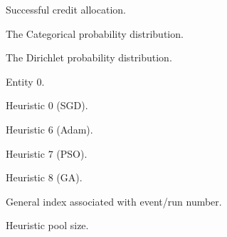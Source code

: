 \begin{description}
	\item [\parbox{2cm}{$c_{1}$}] Successful credit allocation.
	\item [\parbox{2cm}{$Cat$}] The Categorical probability distribution.
	\item [\parbox{2cm}{$Dir$}] The Dirichlet probability distribution.
	\item [\parbox{2cm}{$e_{0}$}] Entity $0$.
	\item [\parbox{2cm}{$h_{0}$}] Heuristic $0$ (\acs{SGD}).
	\item [\parbox{2cm}{$h_{6}$}] Heuristic $6$ (\acs{Adam}).
	\item [\parbox{2cm}{$h_{7}$}] Heuristic $7$ (\acs{PSO}).
	\item [\parbox{2cm}{$h_{8}$}] Heuristic $8$ (\acs{GA}).
	\item [\parbox{2cm}{$i$}] General index associated with event/run number.
	\item [\parbox{2cm}{$K$}] Heuristic pool size.
\end{description}
